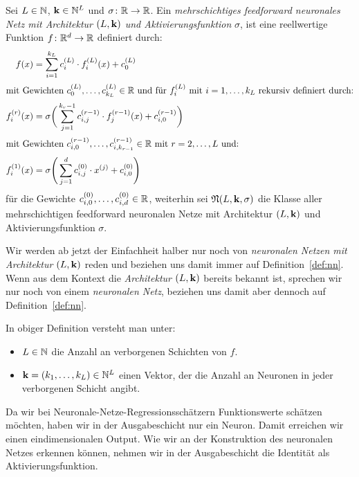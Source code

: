 \begin{defn}
\label{def:nn}
Sei $L \in \mathbb{N}$, $\mathbf{k} \in \mathbb{N}^L$ und $\sigma\colon \mathbb{R} \to \mathbb{R}$. Ein \emph{mehrschichtiges feedforward neuronales Netz mit Architektur $(L, \mathbf{k})$ und Aktivierungsfunktion} $\sigma$, ist eine reellwertige Funktion $f\colon \mathbb{R}^d \to \mathbb{R}$ definiert durch:
\begin{align}
\label{networkarch}
f(x) & = \sum_{i = 1}^{k_L} c_i^{(L)} \cdot f_i^{(L)}(x) + c_0^{(L)} \nonumber \\
\intertext{mit Gewichten $c_0^{(L)},\dots,c_{k_L}^{(L)} \in \mathbb{R}$ und für $f_i^{(L)}$ mit $i = 1,\dots,k_L$ rekursiv definiert durch:} 
f_i^{(r)}(x) & = \sigma \bigg(\sum_{j = 1}^{k_r - 1} c_{i,j}^{(r - 1)} \cdot f_j^{(r - 1)}(x) + c_{i,0}^{(r - 1)} \bigg)\\
\intertext{mit Gewichten $c_{i,0}^{(r - 1)},\dots,c_{i,k_{r - 1}}^{(r - 1)} \in \mathbb{R}$ mit $r = 2,\dots, L$ und:}
f_i^{(1)}(x) & = \sigma \Bigg(\sum_{j = 1}^{d} c_{i,j}^{(0)} \cdot x^{(j)} + c_{i,0}^{(0)} \Bigg) \nonumber
\end{align} 
für die Gewichte $c_{i,0}^{(0)},\dots,c_{i,d}^{(0)} \in \mathbb{R}$,
weiterhin sei $\mathfrak{N}(L, \mathbf{k}, \sigma)$ die Klasse aller mehrschichtigen feedforward neuronalen Netze mit Architektur $(L, \mathbf{k})$ und Aktivierungsfunktion $\sigma$.
\end{defn}
Wir werden ab jetzt der Einfachheit halber nur noch von \emph{neuronalen Netzen mit Architektur $(L,\mathbf{k})$} reden und beziehen uns damit immer auf Definition~\ref{def:nn}. Wenn aus dem Kontext die \emph{Architektur $(L,\mathbf{k})$} bereits bekannt ist, sprechen wir nur noch von einem \emph{neuronalen Netz}, beziehen uns damit aber dennoch auf Definition~\ref{def:nn}.
\begin{bemnumber}
In obiger Definition versteht man unter:
\begin{itemize}
\item $L \in \mathbb{N}$ die Anzahl an verborgenen Schichten von $f$.
\item $\mathbf{k} = (k_1,\dots,k_L) \in \mathbb{N}^L$ einen Vektor, der die Anzahl an Neuronen in jeder verborgenen Schicht angibt.
\end{itemize}
\end{bemnumber}
Da wir bei Neuronale-Netze-Regressionsschätzern Funktionswerte schätzen möchten, haben wir in der Ausgabeschicht nur ein Neuron. Damit erreichen wir einen eindimensionalen Output. Wie wir an der Konstruktion des neuronalen Netzes erkennen können, nehmen wir in der Ausgabeschicht die Identität als Aktivierungsfunktion.

